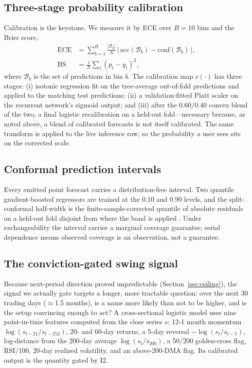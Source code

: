 \documentclass[conference]{IEEEtran}
\begin{document}
\subsection{Three-stage probability calibration}
\label{sec:calib}
Calibration is the keystone. We measure it by ECE over $B=10$ bins and the Brier
score,
\begin{equation}
\begin{aligned}
\mathrm{ECE}&=\sum_{b=1}^{B}\frac{|\mathcal B_b|}{N}\,
\big|\,\mathrm{acc}(\mathcal B_b)-\mathrm{conf}(\mathcal B_b)\,\big|,\\[2pt]
\mathrm{BS}&=\frac1N\sum_t (p_t-y_t)^2,
\end{aligned}
\label{eq:ece}
\end{equation}
where $\mathcal B_b$ is the set of predictions in bin $b$. The calibration map
$c(\cdot)$ has three stages: (i) isotonic regression \cite{zadrozny2002} fit on the
tree-average out-of-fold predictions and applied to the matching test predictions;
(ii) a validation-fitted Platt scaler \cite{platt1999} on the recurrent network's
sigmoid output; and (iii) after the $0.60/0.40$ convex blend of the two, a final
logistic recalibration on a held-out fold---necessary because, as noted above, a
blend of calibrated forecasts is not itself calibrated. The same transform is
applied to the live inference row, so the probability a user sees sits on the
corrected scale.

\subsection{Conformal prediction intervals}
Every emitted point forecast carries a distribution-free interval. Two quantile
gradient-boosted regressors are trained at the 0.10 and 0.90 levels, and the
split-conformal half-width is the finite-sample-corrected quantile of absolute
residuals on a held-out fold disjoint from where the band is applied
\cite{romano2019,angelopoulos2023}. Under exchangeability the interval carries a
marginal coverage guarantee; serial dependence means observed coverage is an
observation, not a guarantee.

\subsection{The conviction-gated swing signal}
Because next-period direction proved unpredictable (Section~\ref{sec:ceiling}), the
signal we actually gate targets a longer, more tractable question: over the next
30 trading days ($\approx$1.5 months), is a name more likely than not to be higher,
and is the setup convincing enough to act? A cross-sectional logistic model uses
nine point-in-time features computed from the close series $s$: 12-1 month
momentum \cite{jegadeesh1993} $\log(s_{t-21}/s_{t-252})$, 20- and 60-day returns,
a 5-day reversal $-\log(s_t/s_{t-5})$, log-distance from the 200-day average
$\log(s_t/\overline s_{200})$, a 50/200 golden-cross flag, RSI/100, 20-day realized
volatility, and an above-200-DMA flag. Its calibrated output is the quantity gated
by I2.
\end{document}
